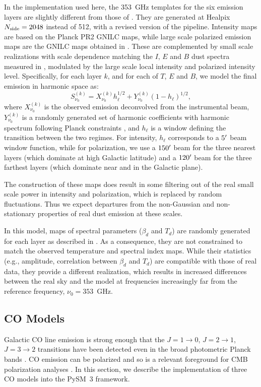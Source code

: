 \documentclass[twocolumn]{aastex631}
\begin{document}
In the implementation used here, the 353~GHz templates for the six emission layers are slightly different from those of \cite{Martinez-Solaeche:2018}. They are generated at Healpix $N_{\rm side} = 2048$ instead of 512, with a revised version of the pipeline. Intensity maps are based on the Planck PR2 GNILC maps, while large scale polarized emission maps are the GNILC maps obtained in \cite{Martinez-Solaeche:2018}. These are complemented by small scale realizations with scale dependence matching the $I$, $E$ and $B$ dust spectra measured in \cite{planck2016-l11A}, modulated by the large scale local intensity and polarized intensity level. Specifically, for each layer $k$, and for each of $T$, $E$ and $B$, we model the final emission in harmonic space as:
\begin{equation}
    S^{(k)}_{\nu_0} = X^{(k)}_{\nu_0} h_\ell^{1/2} + Y^{(k)}_{\nu_0} (1-h_\ell)^{1/2},
\end{equation}
where $X^{(k)}_{\nu_0}$ is the observed emission deconvolved from the instrumental beam, $Y^{(k)}_{\nu_0}$ is a randomly generated set of harmonic coefficients with harmonic spectrum following Planck constraints \citep{planck2016-l11A}, and $h_\ell$ is a window defining the transition between the two regimes. For intensity, $h_\ell$ corresponds to a $5\mbox{$^\prime$}$ beam window function, while for polarization, we use a $150\mbox{$^\prime$}$ beam for the three nearest layers (which dominate at high Galactic latitude) and a $120\mbox{$^\prime$}$ beam for the three farthest layers (which dominate near and in the Galactic plane).

The construction of these maps does result in some filtering out of the real small scale power in intensity and polarization, which is replaced by random fluctuations. Thus we expect departures from the non-Gaussian and non-stationary properties of real dust emission at these scales.

In this model, maps of spectral parameters ($\beta_d$ and $T_d$) are randomly generated for each layer as described in \cite{Martinez-Solaeche:2018}. As a consequence, they are not constrained to match the observed temperature and spectral index maps. While their statistics (e.g., amplitude, correlation between $\beta_d$ and $T_d$) are compatible with those of real data, they provide a different realization, which results in increased differences between the real sky and the model at frequencies increasingly far from the reference frequency, $\nu_0 = 353$~GHz.

\subsection{CO Models} \label{subsec:co_models}
Galactic CO line emission is strong enough that the $J = 1\rightarrow0$, $J = 2\rightarrow1$, $J = 3\rightarrow2$ transitions have been detected even in the broad photometric Planck bands \citep{planck2013-p03a, planck2014-a12}. CO emission can be polarized \citep{Goldreich:1981} and so is a relevant foreground for CMB polarization analyses \citep{Puglisi:2017}. In this section, we describe the implementation of three CO models into the PySM~3 framework.
\end{document}
